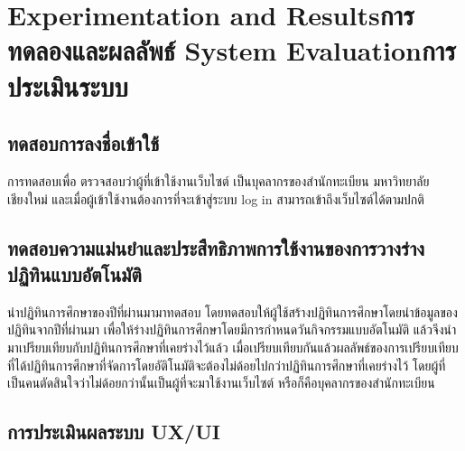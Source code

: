 \chapter{\ifproject%
\ifenglish Experimentation and Results\else การทดลองและผลลัพธ์\fi
\else%
\ifenglish System Evaluation\else การประเมินระบบ\fi
\fi}
\section{ทดสอบการลงชื่อเข้าใช้} 
   การทดสอบเพื่อ ตรวจสอบว่าผู้ที่เข้าใช้งานเว็บไซต์ เป็นบุคลากรของสำนักทะเบียน มหาวิทยาลัยเชียงใหม่ 
และเมื่อผู้เข้าใช้งานต้องการที่จะเข้าสู่ระบบ log in สามารถเข้าถึงเว็บไซต์ได้ตามปกติ

\section{ทดสอบความแม่นยำและประสืทธิภาพการใช้งานของการวางร่างปฏิทินแบบอัตโนมัติ}
   นำปฏิทินการศึกษาของปีที่ผ่านมามาทดสอบ โดยทดสอบให้ผู้ใช้สร้างปฏิทินการศึกษาโดยนำข้อมูลของปฏิทินจากปีที่ผ่านมา 
เพื่อให้ร่างปฏิทินการศึกษาโดยมีการกำหนดวันกิจกรรมแบบอัตโนมัติ แล้วจึงนำมาเปรียบเทียบกับปฏิทินการศึกษาที่เคยร่างไว้แล้ว 
เมื่อเปรียบเทียบกันแล้วผลลัพธ์ของการเปรียบเทียบที่ได้ปฏิทินการศึกษาที่จัดการโดยอัติโนมัติจะต้องไม่ด้อยไปกว่าปฏิทินการศึกษาที่เคยร่างไว้
โดยผู้ที่เป็นคนตัดสินใจว่าไม่ด้อยกว่านั้นเป็นผู้ที่จะมาใช้งานเว็บไซต์ หรือก็คือบุคลากรของสำนักทะเบียน

\section{การประเมินผลระบบ UX/UI} 


